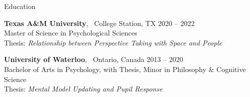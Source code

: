 \documentclass{resume} %
\begin{document}
    \begin{rSection}{Education}
        
        {\textbf{Texas A\&M University}, \ College Station, TX \hfill {2020 -- 
                2022}
            \\ {Master of Science in Psychological Sciences} 
            \\ Thesis: \textit{Relationship between Perspective Taking with 
                Space and People}
        }
        
        {\textbf{University of Waterloo}, \ Ontario, Canada \hfill 
            {2013 -- 2020}
            \\ {Bachelor of Arts in Psychology, with Thesis, Minor in 
                Philosophy \& Cognitive Science}
            \\ Thesis: \textit{Mental Model Updating and Pupil Response}
        }
        
    \end{rSection}
    
\end{document}
